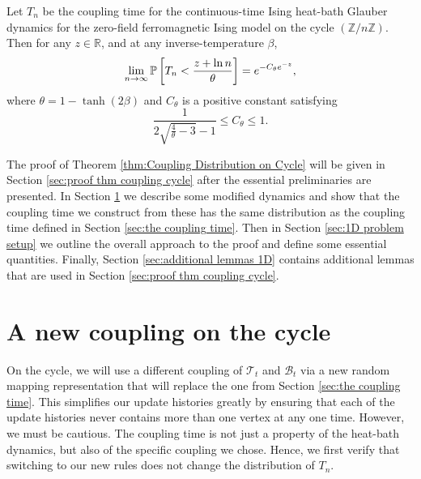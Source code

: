 

	\begin{theorem}
	\label{thm:Coupling Distribution on Cycle}
		Let $T_n$ be the coupling time for the continuous-time Ising heat-bath Glauber dynamics for the zero-field ferromagnetic Ising model on the cycle $(\mathbb{Z} / n\mathbb{Z})$. Then for any $z \in \mathbb{R}$, and at any inverse-temperature $\beta$,
		\begin{equation}
			\lim_{n \rightarrow \infty} \mathbb{P}\left[T_n < \frac{z + \ln n}{\theta}\right] = e^{-C_\theta e^{-z}},
		\end{equation}
		where $\theta = 1 - \tanh(2\beta)$ and $C_\theta$ is a positive constant satisfying
		\begin{equation}
			\frac{1}{2\sqrt{\frac{4}{\theta} - 3} - 1} \leq C_\theta \leq 1.
		\end{equation}
	\end{theorem}

	The proof of Theorem \ref{thm:Coupling Distribution on Cycle} will be given in Section \ref{sec:proof thm coupling cycle} after the essential preliminaries are presented. In Section \ref{sec:information percolation on the cycle} we describe some modified dynamics and show that the coupling time we construct from these has the same distribution as the coupling time defined in Section \ref{sec:the coupling time}. Then in Section \ref{sec:1D problem setup} we outline the overall approach to the proof and define some essential quantities. Finally, Section \ref{sec:additional lemmas 1D} contains additional lemmas that are used in Section \ref{sec:proof thm coupling cycle}.

	\section{A new coupling on the cycle}
	\label{sec:information percolation on the cycle}

	On the cycle, we will use a different coupling of $\mathscr{T}_t$ and $\mathscr{B}_t$ via a new random mapping representation that will replace the one from Section \ref{sec:the coupling time}. This simplifies our update histories greatly by ensuring that each of the update histories never contains more than one vertex at any one time. However, we must be cautious. The coupling time is not just a property of the heat-bath dynamics, but also of the specific coupling we chose. Hence, we first verify that switching to our new rules does not change the distribution of $T_n$.

